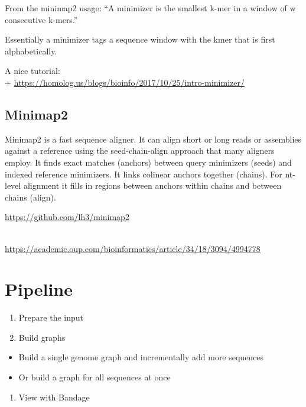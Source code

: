 \documentclass[
]{book}
\providecommand{\tightlist}{%
  \setlength{\itemsep}{0pt}\setlength{\parskip}{0pt}}
\begin{document}
From the minimap2 usage:
``A minimizer is the smallest k-mer in a window of w consecutive k-mers.''

Essentially a minimizer tags a sequence window with the kmer that is first alphabetically.

A nice tutorial:\\
+ \url{https://homolog.us/blogs/bioinfo/2017/10/25/intro-minimizer/}

\hypertarget{minimap2}{%
\subsection*{Minimap2}\label{minimap2}}

Minimap2 is a fast sequence aligner.
It can align short or long reads or assemblies against a reference using the seed-chain-align approach that many aligners employ. It finds exact matches (anchors) between query minimizers (seeds) and indexed reference minimizers. It links colinear anchors together (chains). For nt-level alignment it fills in regions between anchors within chains and between chains (align).

\url{https://github.com/lh3/minimap2}\strut \\
\url{https://academic.oup.com/bioinformatics/article/34/18/3094/4994778}

\hypertarget{pipeline-1}{%
\section{Pipeline}\label{pipeline-1}}

\begin{enumerate}
\def\labelenumi{\arabic{enumi}.}
\tightlist
\item
  Prepare the input
\item
  Build graphs
\end{enumerate}

\begin{itemize}
\tightlist
\item
  Build a single genome graph and incrementally add more sequences
\item
  Or build a graph for all sequences at once
\end{itemize}

\begin{enumerate}
\def\labelenumi{\arabic{enumi}.}
\setcounter{enumi}{2}
\tightlist
\item
  View with Bandage
\end{enumerate}
\end{document}
